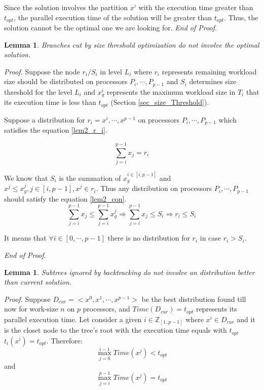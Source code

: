 \documentclass[12pt]{article}
\newtheorem{lemma}[theorem]{Lemma}
\begin{document}
Since the solution involves the partition $x^i$ with the execution time greater than $t_{opt}$, the parallel execution time of the solution will be greater than $t_{opt}$. Thus, the solution cannot be the optimal one we are looking for. \textit{End of Proof}.

\begin{lemma}	\label{lem_size_threshold}
	Branches cut by size threshold optimization do not involve the optimal solution.
\end{lemma}

\textit{Proof.} Suppose the node $r_i/S_i$ in level $L_i$ where $r_i$ represents remaining workload size should be distributed on processors $P_i,\cdots,P_{p-1}$ and $S_i$ determines size threshold for the level $L_i$ and $x_g^i$ represents the maximum workload size in $T_i$ that its execution time is less than $t_{opt}$ (Section \ref{sec_size_Threshold}).

Suppose a distribution for $r_i = {x^i,\cdots,x^{p-1}}$ on processors $P_i,\cdots,P_{p-1}$ which satisfies the equation \ref{lem2_r_i}.

\begin{equation}	\label{lem2_r_i}
\sum_{j=i}^{p-1} x_j = r_i
\end{equation}

We know that $S_i$ is the summation of $x_g^{i \in [i,p-1]}$ and $x^j \le x_g^j, j \in [i,p-1] , x^j \in r_i$. Thus any distribution on processors $P_i,\cdots,P_{p-1}$ should satisfy the equation \ref{lem2_con}. 
\begin{equation}	\label{lem2_con}
\sum_{j=i}^{p-1} x_j \le \sum_{j=i}^{p-1} x_g^j \Longrightarrow \sum_{j=i}^{p-1} x_j \le S_i \Longrightarrow r_i \le S_i
\end{equation}

It means that $\forall i \in [0,\cdots, p-1]$ there is no distribution for $r_i$ in case $r_i > S_i$.

\textit{End of Proof}.

\begin{lemma}	\label{lem_backtracking}
	Subtrees ignored by backtracking do not involve an distribution better than current solution.
\end{lemma}

\textit{Proof.} Suppose $D_{cur} = <x^0, x^1,\cdots,x^{p-1}>$ be the best distribution found till now for work-size $n$ on $p$ processors, and $Time(D_{cur}) = t_{opt}$ represents its parallel execution time. Let consider a given $i \in \mathbb{Z}_{[1..p - 1]}$ where $x^i \in D_{cur}$ and it is the closet node to the tree's root with the execution time equals with $t_{opt}$ $t_i(x^i)=t_{opt}$. Therefore:
$$\max_{j=0}^{i-1} Time(x^j) < t_{opt}$$
and
$$\max_{j=i}^{p-1} Time(x^j) = t_{opt}$$
\end{document}

